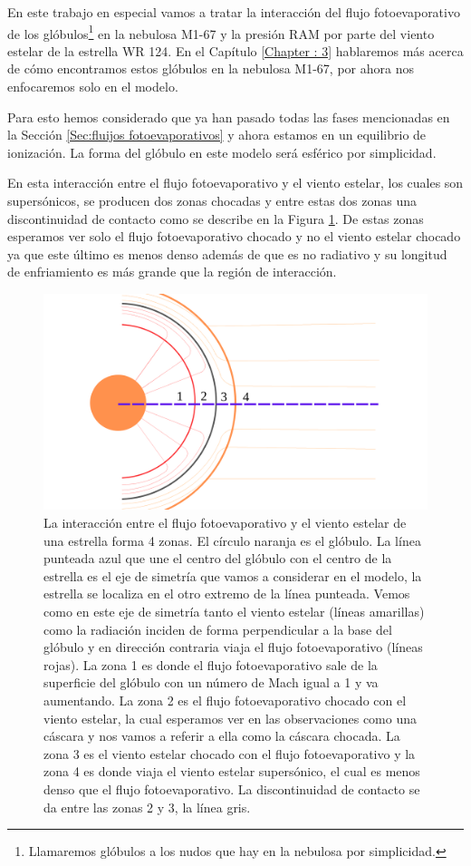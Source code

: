 \documentclass{book}
\begin{document}
En este trabajo en especial vamos a tratar la interacción del flujo fotoevaporativo de los glóbulos\footnote{Llamaremos glóbulos a los nudos que hay en la nebulosa por simplicidad.} en la nebulosa M1-67 y la presión RAM por parte del viento estelar de la estrella WR 124. En el Capítulo \ref{Chapter : 3} hablaremos más acerca de cómo encontramos estos glóbulos en la nebulosa M1-67, por ahora nos enfocaremos solo en el modelo.

Para esto hemos considerado que ya han pasado todas las fases mencionadas en la Sección \ref{Sec:fluijos fotoevaporativos} y ahora estamos en un equilibrio de ionización. La forma del glóbulo en este modelo será esférico por simplicidad.

En esta interacción entre el flujo fotoevaporativo y el viento estelar, los cuales son supersónicos, se producen dos zonas chocadas y entre estas dos zonas una discontinuidad de contacto como se describe en la Figura \ref{fig:zones}. De estas zonas esperamos ver solo el flujo fotoevaporativo chocado y no el viento estelar chocado ya que este último es menos denso además de que es no radiativo y su longitud de enfriamiento es más grande que la región de interacción.

\begin{figure}[htb]
    \centering    \includegraphics[width=\textwidth]{Nuevas imagenes finales/C2_zone_new_01.pdf}
    \caption{La interacción entre el flujo fotoevaporativo y el viento estelar de una estrella forma 4 zonas. El círculo naranja es el glóbulo. La línea punteada azul que une el centro del  glóbulo con el centro de la estrella es el eje de simetría que vamos a considerar en el modelo, la estrella se localiza en el otro extremo de la línea punteada. Vemos como en este eje de simetría tanto el viento estelar (líneas amarillas) como la radiación inciden de forma perpendicular a la base del glóbulo y en dirección contraria viaja el flujo fotoevaporativo (líneas rojas). La zona 1 es donde el flujo fotoevaporativo sale de la superficie del glóbulo con un número de Mach igual a 1 y va aumentando. La zona 2 es el flujo fotoevaporativo chocado con el viento estelar, la cual esperamos ver en las observaciones como una cáscara y nos vamos a referir a ella como la cáscara chocada. La zona 3 es el viento estelar chocado con el flujo fotoevaporativo y la zona 4 es donde viaja el viento estelar supersónico, el cual es menos denso que el flujo fotoevaporativo. La discontinuidad de contacto se da entre las zonas 2 y 3, la línea gris.}
    \label{fig:zones}
\end{figure}
\end{document}
